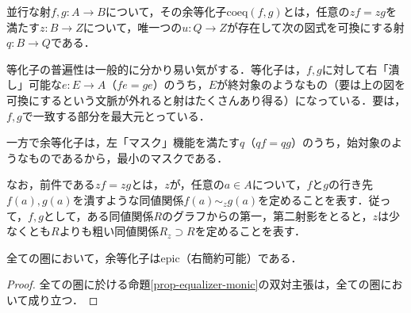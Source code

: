 \documentclass[uplatex, dvipdfmx]{jsarticle}
\begin{document}
\begin{definition}
    並行な射$f,g:A\to B$について，その余等化子$\mathrm{coeq}(f,g)$とは，任意の$zf=zg$を満たす$z:B\to Z$について，唯一つの$u:Q\to Z$が存在して次の図式を可換にする射$q:B\to Q$である．
    \begin{center}
    \end{center}
\end{definition}
\begin{remark*}[なんかすごい言い換え見つけた]
    等化子の普遍性は一般的に分かり易い気がする．等化子は，$f,g$に対して右「潰し」可能な$e:E\to A$（$fe=ge$）のうち，$E$が終対象のようなもの（要は上の図を可換にするという文脈が外れると射はたくさんあり得る）になっている．要は，$f,g$で一致する部分を最大元とっている．

    一方で余等化子は，左「マスク」機能を満たす$q$（$qf=qg$）のうち，始対象のようなものであるから，最小のマスクである．

    なお，前件である$zf=zg$とは，$z$が，任意の$a\in A$について，$f$と$g$の行き先$f(a),g(a)$を潰すような同値関係$f(a)\sim_zg(a)$を定めることを表す．従って，$f,g$として，ある同値関係$R$のグラフからの第一，第二射影をとると，$z$は少なくとも$R$よりも粗い同値関係$R_z\supset R$を定めることを表す．
\end{remark*}
\begin{proposition}\label{prop-coequalizer-epic}
    全ての圏において，余等化子はepic（右簡約可能）である．
\end{proposition}
\begin{proof}
    全ての圏に於ける命題\ref{prop-equalizer-monic}の双対主張は，全ての圏において成り立つ．
\end{proof}
\end{document}
